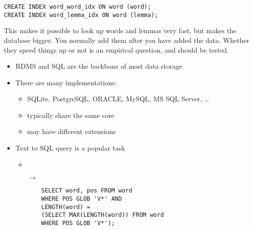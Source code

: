 \documentclass[a4paper,landscape,headrule,footrule,xetex]{foils}
\begin{document}
\begin{verbatim}
CREATE INDEX word_word_idx ON word (word);
CREATE INDEX word_lemma_idx ON word (lemma);
\end{verbatim}

This makes it possible to look up words and lemmas very fast, but makes the
database bigger.  You normally add them after you have added the
data.  Whether they speed things up or not is an empirical question,
and should be tested.



\begin{itemize}
\item RDMS and SQL are the backbone of most data storage
\item There are many implementations:
  \begin{itemize}
  \item SQLite, PostgreSQL, ORACLE, MySQL, MS SQL Server, \ldots
  \item typically share the same core
  \item may have different extensions
  \end{itemize}
\item Text to SQL query is a popular task
  \begin{itemize}
  \item {}
  \item[\ensuremath{\rightarrow}]
\begin{verbatim}
    SELECT word, pos FROM word
    WHERE POS GLOB 'V*' AND
    LENGTH(word) =
    (SELECT MAX(LENGTH(word)) FROM word
    WHERE POS GLOB 'V*');
\end{verbatim}
    
    
  \end{itemize}

\end{itemize}



\end{document}

